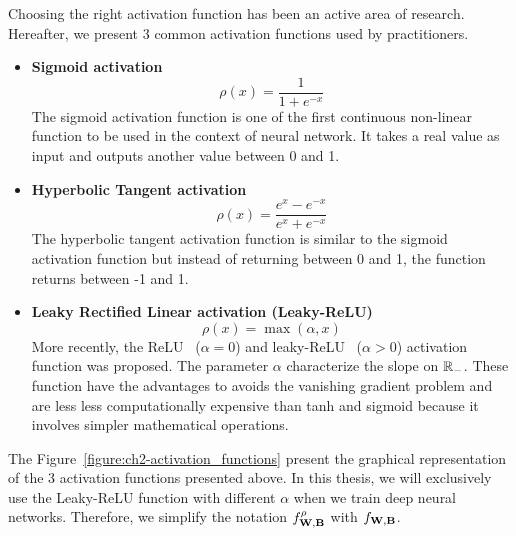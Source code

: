 \noindent
Choosing the right activation function has been an active area of research. 
Hereafter, we present 3 common activation functions used by practitioners.
\begin{itemize}
  \item \textbf{Sigmoid activation} \cite{han1995influence}
    \begin{equation*}
      \rho(x) = \frac{1}{1+e^{-x}} 
    \end{equation*}
    The sigmoid activation function is one of the first continuous non-linear function to be used in the context of neural network. It takes a real value as input and outputs another value between 0 and 1.
  \item \textbf{Hyperbolic Tangent activation} \cite{karlik2011performance}
    \begin{equation*}
      \rho(x) = \frac{e^x - e^{-x}}{e^x + e^{-x}}
    \end{equation*}
    The hyperbolic tangent activation function is similar to the sigmoid activation function but instead of returning between 0 and 1, the function returns between -1 and 1.     
  \item \textbf{Leaky Rectified Linear activation (Leaky-ReLU)} \cite{maas2013rectifier}
    \begin{equation*}
      \rho(x) = \max(\alpha, x)
    \end{equation*}
    More recently, the ReLU~\cite{nair2010rectified} ($\alpha = 0$) and leaky-ReLU~\cite{maas2013rectifier} ($\alpha > 0$) activation function was proposed.
    The parameter $\alpha$ characterize the slope on $\mathbb{R}_-$.
    These function have the advantages to avoids the vanishing gradient problem and are less less computationally expensive than tanh and sigmoid because it involves simpler mathematical operations.
\end{itemize}

\noindent
The Figure~\ref{figure:ch2-activation_functions} present the graphical representation of the 3 activation functions presented above.
In this thesis, we will exclusively use the Leaky-ReLU function with different $\alpha$ when we train deep neural networks.
Therefore, we simplify the notation $f^{\rho}_{\mathbf{W}, \mathbf{B}}$ with $f_{\mathbf{W}, \mathbf{B}}$.




\drawline


%


